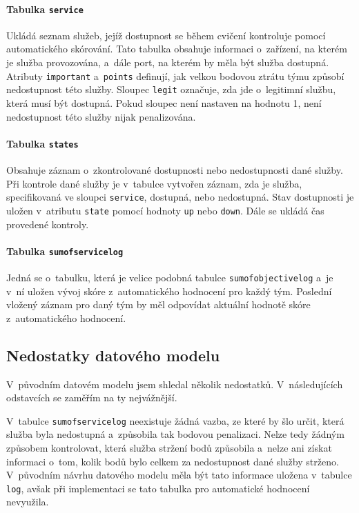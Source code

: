 \documentclass[
  digital,
  twoside,
  table, 
  nolof, 
  nolot
]{fithesis3}
\begin{document}
\paragraph{Tabulka \texttt{service}} Ukládá seznam služeb, jejíž dostupnost se během cvičení kontroluje pomocí automatického skórování. Tato tabulka obsahuje informaci o~zařízení, na kterém je služba provozována, a~dále port, na kterém by měla být služba dostupná. Atributy \texttt{important} a~\texttt{points} definují, jak velkou bodovou ztrátu týmu způsobí nedostupnost této služby. Sloupec \texttt{legit} označuje, zda jde o~legitimní službu, která musí být dostupná. Pokud sloupec není nastaven na hodnotu 1, není nedostupnost této služby nijak penalizována. 

\paragraph{Tabulka \texttt{states}} Obsahuje záznam o~zkontrolované dostupnosti nebo nedostupnosti dané služby. Při kontrole dané služby je v~tabulce vytvořen záznam, zda je služba, specifikovaná ve sloupci \texttt{service}, dostupná, nebo nedostupná. Stav dostupnosti je uložen v~atributu \texttt{state} pomocí hodnoty \texttt{up} nebo \texttt{down}. Dále se ukládá čas provedené kontroly.

\paragraph{Tabulka \texttt{sumofservicelog}} Jedná se o~tabulku, která je velice podobná tabulce \texttt{sumofobjectivelog} a~je v~ní uložen vývoj skóre z~automatického hodnocení pro každý tým. Poslední vložený záznam pro daný tým by měl odpovídat aktuální hodnotě skóre z~automatického hodnocení.

\subsection{Nedostatky datového modelu}

V~původním datovém modelu jsem shledal několik nedostatků. V~následujících odstavcích se zaměřím na ty nejvážnější.

V~tabulce \texttt{sumofservicelog} neexistuje žádná vazba, ze které by šlo určit, která služba byla nedostupná a~způsobila tak bodovou penalizaci. Nelze tedy žádným způsobem kontrolovat, která služba stržení bodů způsobila a~nelze ani získat informaci o~tom, kolik bodů bylo celkem za nedostupnost dané služby strženo. V~původním návrhu datového modelu měla být tato informace uložena v~tabulce \texttt{log}, avšak při implementaci se tato tabulka pro automatické hodnocení nevyužila. 
\end{document}
